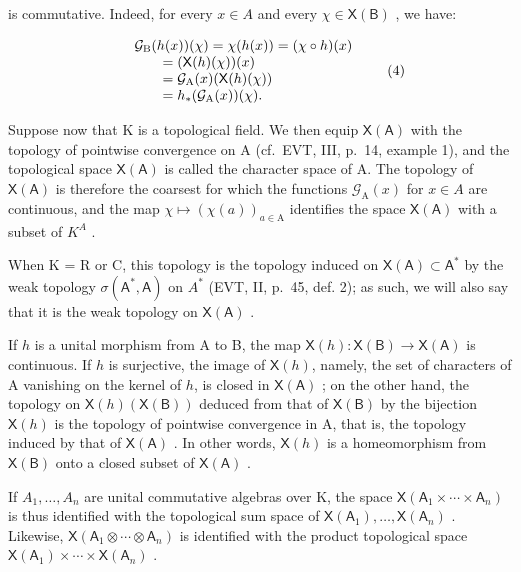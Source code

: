 is commutative. Indeed, for every \(x \in A\) and every \(\chi \in \mathsf{X}(\mathsf{B})\) , we have:

\[
\begin{array}{r l} & {\mathcal {G} _ {\mathrm{B}} (h (x)) (\chi) = \chi (h (x)) = (\chi \circ h) (x)} \\ & {\qquad = (\mathsf {X} (h) (\chi)) (x)} \\ & {\qquad = \mathcal {G} _ {\mathrm{A}} (x) (\mathsf {X} (h) (\chi))} \\ & {\qquad = h _ {*} (\mathcal {G} _ {\mathrm{A}} (x)) (\chi).} \end{array}\tag{4}
\]

Suppose now that K is a topological field. We then equip \(\mathsf{X}(\mathsf{A})\) with the topology of pointwise convergence on A (cf.~EVT, III, p.~14, example 1), and the topological space \(\mathsf{X}(\mathsf{A})\) is called the character space of A. The topology of \(\mathsf{X}(\mathsf{A})\) is therefore the coarsest for which the functions \(\mathcal{G}_{\mathrm{A}}(x)\) for \(x \in A\) are continuous, and the map \(\chi \mapsto (\chi(a))_{a \in \mathrm{A}}\) identifies the space \(\mathsf{X}(\mathsf{A})\) with a subset of \(K^{A}\) .

When K = R or C, this topology is the topology induced on \(\mathsf{X}(\mathsf{A}) \subset \mathsf{A}^{*}\) by the weak topology \(\sigma(\mathsf{A}^{*}, \mathsf{A})\) on \(A^{*}\) (EVT, II, p.~45, def. 2); as such, we will also say that it is the weak topology on \(\mathsf{X}(\mathsf{A})\) .

If \(h\) is a unital morphism from A to B, the map \(\mathsf{X}(h)\colon \mathsf{X}(\mathsf{B})\to \mathsf{X}(\mathsf{A})\) is continuous. If \(h\) is surjective, the image of \(\mathsf{X}(h)\), namely, the set of characters of A vanishing on the kernel of \(h\), is closed in \(\mathsf{X}(\mathsf{A})\) ; on the other hand, the topology on \(\mathsf{X}(h)(\mathsf{X}(\mathsf{B}))\) deduced from that of \(\mathsf{X}(\mathsf{B})\) by the bijection \(\mathsf{X}(h)\) is the topology of pointwise convergence in A, that is, the topology induced by that of \(\mathsf{X}(\mathsf{A})\) . In other words, \(\mathsf{X}(h)\) is a homeomorphism from \(\mathsf{X}(\mathsf{B})\) onto a closed subset of \(\mathsf{X}(\mathsf{A})\) .

If \(A_{1},\ldots,A_{n}\) are unital commutative algebras over K, the space \(\mathsf{X}(\mathsf{A}_{1}\times\cdots\times\mathsf{A}_{n})\) is thus identified with the topological sum space of \(\mathsf{X}(\mathsf{A}_{1}),\ldots,\mathsf{X}(\mathsf{A}_{n})\) . Likewise, \(\mathsf{X}(\mathsf{A}_{1}\otimes\cdots\otimes\mathsf{A}_{n})\) is identified with the product topological space \(\mathsf{X}(\mathsf{A}_{1})\times\cdots\times\mathsf{X}(\mathsf{A}_{n})\) .

